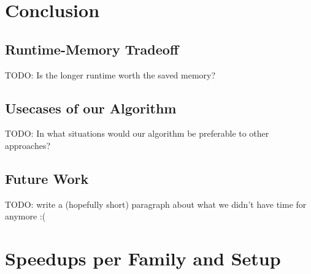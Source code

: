 \documentclass[12pt,a4paper,twoside]{scrartcl}
\numberwithin{equation}{section}
\begin{document}

\section{Conclusion}

\subsection{Runtime-Memory Tradeoff}

TODO: Is the longer runtime worth the saved memory?

\subsection{Usecases of our Algorithm}

TODO: In what situations would our algorithm be preferable to other approaches?

\subsection{Future Work}

TODO: write a (hopefully short) paragraph about what we didn't have time for anymore :(


\clearpage


\appendix

\section{Speedups per Family and Setup}
\label{app:speedupsFamiliesComplete}
\end{document}
